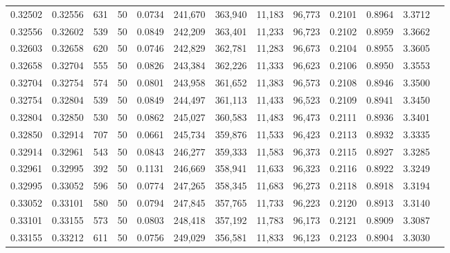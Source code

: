 \begin{tabular}{rrrrrrrrrrrrr}
0.32502 & 0.32556 &   631 &  50 &                                     0.0734 & 241,670 & 363,940 &  11,183 &  96,773 & 0.2101 & 0.8964 & 3.3712 \\
0.32556 & 0.32602 &   539 &  50 &                                     0.0849 & 242,209 & 363,401 &  11,233 &  96,723 & 0.2102 & 0.8959 & 3.3662 \\
0.32603 & 0.32658 &   620 &  50 &                                     0.0746 & 242,829 & 362,781 &  11,283 &  96,673 & 0.2104 & 0.8955 & 3.3605 \\
0.32658 & 0.32704 &   555 &  50 &                                     0.0826 & 243,384 & 362,226 &  11,333 &  96,623 & 0.2106 & 0.8950 & 3.3553 \\
0.32704 & 0.32754 &   574 &  50 &                                     0.0801 & 243,958 & 361,652 &  11,383 &  96,573 & 0.2108 & 0.8946 & 3.3500 \\
0.32754 & 0.32804 &   539 &  50 &                                     0.0849 & 244,497 & 361,113 &  11,433 &  96,523 & 0.2109 & 0.8941 & 3.3450 \\
0.32804 & 0.32850 &   530 &  50 &                                     0.0862 & 245,027 & 360,583 &  11,483 &  96,473 & 0.2111 & 0.8936 & 3.3401 \\
0.32850 & 0.32914 &   707 &  50 &                                     0.0661 & 245,734 & 359,876 &  11,533 &  96,423 & 0.2113 & 0.8932 & 3.3335 \\
0.32914 & 0.32961 &   543 &  50 &                                     0.0843 & 246,277 & 359,333 &  11,583 &  96,373 & 0.2115 & 0.8927 & 3.3285 \\
0.32961 & 0.32995 &   392 &  50 &                                     0.1131 & 246,669 & 358,941 &  11,633 &  96,323 & 0.2116 & 0.8922 & 3.3249 \\
0.32995 & 0.33052 &   596 &  50 &                                     0.0774 & 247,265 & 358,345 &  11,683 &  96,273 & 0.2118 & 0.8918 & 3.3194 \\
0.33052 & 0.33101 &   580 &  50 &                                     0.0794 & 247,845 & 357,765 &  11,733 &  96,223 & 0.2120 & 0.8913 & 3.3140 \\
0.33101 & 0.33155 &   573 &  50 &                                     0.0803 & 248,418 & 357,192 &  11,783 &  96,173 & 0.2121 & 0.8909 & 3.3087 \\
0.33155 & 0.33212 &   611 &  50 &                                     0.0756 & 249,029 & 356,581 &  11,833 &  96,123 & 0.2123 & 0.8904 & 3.3030 \\

\end{tabular}

